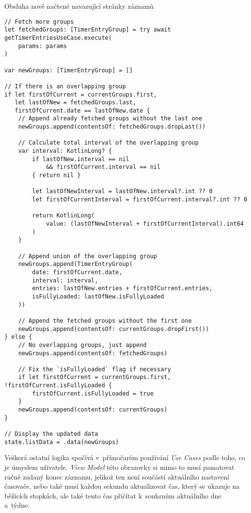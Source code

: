 \begin{listing}
\caption{Obsluha nově načtené navazující stránky záznamů}\label{code:view-mode-entry-group-overlap}
\begin{verbatim}
// Fetch more groups
let fetchedGroups: [TimerEntryGroup] = try await getTimerEntriesUseCase.execute(
    params: params
)

var newGroups: [TimerEntryGroup] = []

// If there is an overlapping group
if let firstOfCurrent = currentGroups.first,
   let lastOfNew = fetchedGroups.last,
   firstOfCurrent.date == lastOfNew.date {
    // Append already fetched groups without the last one
    newGroups.append(contentsOf: fetchedGroups.dropLast())
    
    // Calculate total interval of the overlapping group
    var interval: KotlinLong? {
        if lastOfNew.interval == nil 
            && firstOfCurrent.interval == nil 
        { return nil }
        
        let lastOfNewInterval = lastOfNew.interval?.int ?? 0
        let firstOfCurrentInterval = firstOfCurrent.interval?.int ?? 0
        
        return KotlinLong(
            value: (lastOfNewInterval + firstOfCurrentInterval).int64
        )
    }
    
    // Append union of the overlapping group
    newGroups.append(TimerEntryGroup(
        date: firstOfCurrent.date,
        interval: interval,
        entries: lastOfNew.entries + firstOfCurrent.entries,
        isFullyLoaded: lastOfNew.isFullyLoaded
    ))
    
    // Append the fetched groups without the first one
    newGroups.append(contentsOf: currentGroups.dropFirst())
} else {
    // No overlapping groups, just append
    newGroups.append(contentsOf: fetchedGroups)
    
    // Fix the `isFullyLoaded` flag if necessary
    if let firstOfCurrent = currentGroups.first, !firstOfCurrent.isFullyLoaded {
        firstOfCurrent.isFullyLoaded = true
    }
    newGroups.append(contentsOf: currentGroups)
}

// Display the updated data
state.listData = .data(newGroups)
\end{verbatim}
\end{listing}

Veškerá ostatní logika spočívá v~přímočarém používání \emph{Use Cases} podle toho, co je úmyslem uživatele. \emph{View Model} této obrazovky si mimo to musí pamatovat ručně zadaný konec záznamu, jelikož ten není součástí aktuálního nastavení časovače, nebo také musí každou sekundu aktualizovat čas, který se ukazuje na běžících stopkách, ale také tento čas přičítat k~souhrnům aktuálního dne a~týdne.

